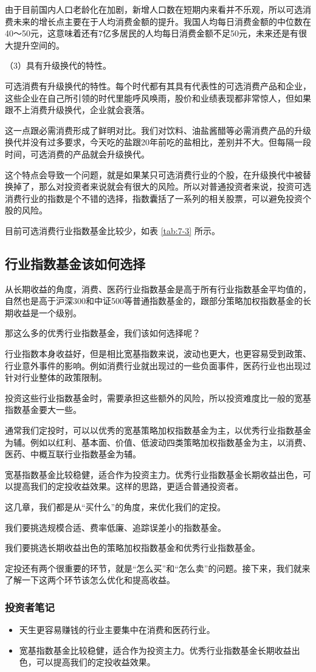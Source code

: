 由于目前国内人口老龄化在加剧，新增人口数在短期内来看并不乐观，所以可选消费未来的增长点主要在于人均消费金额的提升。我国人均每日消费金额的中位数在40～50元，这意味着还有7亿多居民的人均每日消费金额不足50元，未来还是有很大提升空间的。

（3）具有升级换代的特性。

可选消费有升级换代的特性。每个时代都有其具有代表性的可选消费产品和企业，这些企业在自己所引领的时代里能呼风唤雨，股价和业绩表现都非常惊人，但如果跟不上消费升级换代，企业就会衰落。

这一点跟必需消费形成了鲜明对比。我们对饮料、油盐酱醋等必需消费产品的升级换代并没有过多要求，今天吃的盐跟20年前吃的盐相比，差别并不大。但每隔一段时间，可选消费的产品就会升级换代。

这个特点会导致一个问题，就是如果某只可选消费行业的个股，在升级换代中被替换掉了，那么对投资者来说就会有很大的风险。所以对普通投资者来说，投资可选消费行业的指数是个不错的选择，指数囊括了一系列的相关股票，可以避免投资个股的风险。

目前可选消费行业指数基金比较少，如表 \ref{tab:7-3} 所示。



\subsection{行业指数基金该如何选择}

从长期收益的角度，消费、医药行业指数基金是高于所有行业指数基金平均值的，自然也是高于沪深300和中证500等普通指数基金的，跟部分策略加权指数基金的长期收益是一个级别。

那这么多的优秀行业指数基金，我们该如何选择呢？

行业指数本身收益好，但是相比宽基指数来说，波动也更大，也更容易受到政策、行业意外事件的影响。例如消费行业就出现过的一些负面事件，医药行业也出现过针对行业整体的政策限制。

投资这些行业指数基金时，需要承担这些额外的风险，所以投资难度比一般的宽基指数基金要大一些。

通常我们定投时，可以以优秀的宽基策略加权指数基金为主，以优秀行业指数基金为辅。例如以红利、基本面、价值、低波动四类策略加权指数基金为主，以消费、医药、中概互联行业指数基金为辅。

宽基指数基金比较稳健，适合作为投资主力。优秀行业指数基金长期收益出色，可以提高我们的定投收益效果。这样的思路，更适合普通投资者。

这几章，我们都是从“买什么”的角度，来优化我们的定投。

我们要挑选规模合适、费率低廉、追踪误差小的指数基金。

我们要挑选长期收益出色的策略加权指数基金和优秀行业指数基金。

定投还有两个很重要的环节，就是“怎么买”和“怎么卖”的问题。接下来，我们就来了解一下这两个环节该怎么优化和提高收益。

\subsubsection{投资者笔记}

\begin{itemize}
\item {\kaishu 天生更容易赚钱的行业主要集中在消费和医药行业。}
\item {\kaishu 宽基指数基金比较稳健，适合作为投资主力。优秀行业指数基金长期收益出色，可以提高我们的定投收益效果。}
\end{itemize}

